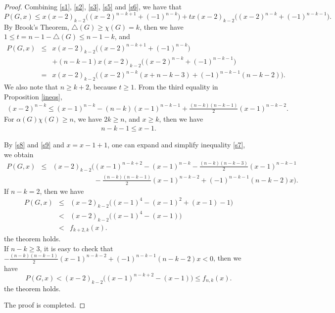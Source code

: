 \documentclass[12pt]{article}
\theoremstyle{definition}
\begin{document}
\begin{proof}
Combining \eqref{s1}, \eqref{s2}, \eqref{s3}, \eqref{s5} and \eqref{s6}, we have that
$$P(G,x)\leq x(x-2)_{k-2}\big((x-2)^{n-k+1}+(-1)^{n-k}\big)+tx(x-2)_{k-2}\big((x-2)^{n-k}+(-1)^{n-k-1}\big).$$
By Brook's Theorem, $\triangle(G)\geq \chi(G)=k$, then we have $1\leq t=n-1-\triangle(G)\leq n-1-k$, and
\begin{eqnarray}\label{s7}P(G,x)&\leq &x(x-2)_{k-2}\big((x-2)^{n-k+1}+(-1)^{n-k}\big)\nonumber\\
&&+(n-k-1)x(x-2)_{k-2}\big((x-2)^{n-k}+(-1)^{n-k-1}\big)\nonumber\\
&=&x(x-2)_{k-2}\big((x-2)^{n-k}(x+n-k-3)+(-1)^{n-k-1}(n-k-2)\big).
\end{eqnarray}
We also note that $n\geq k+2$, because $t\geq 1$.
From the third equality in Proposition \ref{ineqs},
\begin{eqnarray}\label{s8}(x-2)^{n-k}\leq(x-1)^{n-k}-(n-k)(x-1)^{n-k-1}+\frac{(n-k)(n-k-1)}{2}(x-1)^{n-k-2}.\end{eqnarray}
For $\alpha(G)\chi(G)\geq n$, we have $2k\geq n$, and $x\geq k$, then we have
\begin{eqnarray}\label{s9} n-k-1\leq x-1. \end{eqnarray}


By \eqref{s8} and \eqref{s9} and $x=x-1+1$, one can expand and simplify inequality \eqref{s7}, we obtain
\begin{eqnarray*}P(G,x)&\leq &(x-2)_{k-2}\Big((x-1)^{n-k+2}-(x-1)^{n-k}-\frac{(n-k)(n-k-3)}{2}(x-1)^{n-k-1}\\
&&\qquad\qquad\qquad-\frac{(n-k)(n-k-1)}{2}(x-1)^{n-k-2}+(-1)^{n-k-1}(n-k-2)x\Big).
\end{eqnarray*}
If $n-k=2$, then we have
\begin{eqnarray*}P(G,x)&\leq&(x-2)_{k-2}\big((x-1)^4-(x-1)^2+(x-1)-1\big)\\
&<&(x-2)_{k-2}\big((x-1)^4-(x-1))\\
&<&f_{k+2,k}(x).
\end{eqnarray*}
the theorem holds.
\\If $n-k\geq 3$, it is easy to check that $-\frac{(n-k)(n-k-1)}{2}(x-1)^{n-k-2}+(-1)^{n-k-1}(n-k-2)x<0$, then we have
$$P(G,x)<(x-2)_{k-2}\big((x-1)^{n-k+2}-(x-1)\big)\leq f_{n,k}(x).$$ the theorem holds.

The proof is completed.
\end{proof}
\end{document}
